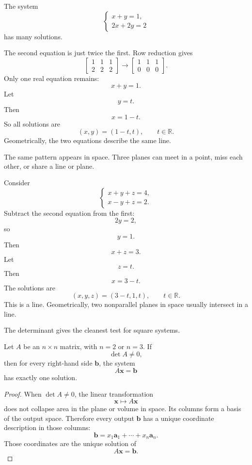 \begin{example}
The system
\[
\begin{cases}
x+y=1,\\
2x+2y=2
\end{cases}
\]
has many solutions.

The second equation is just twice the first.  Row reduction gives
\[
\left[
\begin{array}{cc|c}
1&1&1\\
2&2&2
\end{array}
\right]
\longrightarrow
\left[
\begin{array}{cc|c}
1&1&1\\
0&0&0
\end{array}
\right].
\]
Only one real equation remains:
\[
    x+y=1.
\]
Let
\[
    y=t.
\]
Then
\[
    x=1-t.
\]
So all solutions are
\[
\boxed{
    (x,y)=(1-t,t),\qquad t\in\mathbb R.
}
\]
Geometrically, the two equations describe the same line.
\end{example}

The same pattern appears in space.  Three planes can meet in a point, miss each other,
or share a line or plane.

\begin{example}
Consider
\[
\begin{cases}
x+y+z=4,\\
x-y+z=2.
\end{cases}
\]
Subtract the second equation from the first:
\[
    2y=2,
\]
so
\[
    y=1.
\]
Then
\[
    x+z=3.
\]
Let
\[
    z=t.
\]
Then
\[
    x=3-t.
\]
The solutions are
\[
\boxed{
    (x,y,z)=(3-t,1,t),\qquad t\in\mathbb R.
}
\]
This is a line.  Geometrically, two nonparallel planes in space usually intersect in a
line.
\end{example}

The determinant gives the cleanest test for square systems.

\begin{theorem}
Let \(A\) be an \(n\times n\) matrix, with \(n=2\) or \(n=3\).  If
\[
    \det A\neq0,
\]
then for every right-hand side \(\mathbf b\), the system
\[
    A\mathbf x=\mathbf b
\]
has exactly one solution.
\end{theorem}

\begin{proof}
When \(\det A\neq0\), the linear transformation
\[
    \mathbf x\longmapsto A\mathbf x
\]
does not collapse area in the plane or volume in space.  Its columns form a basis of
the output space.  Therefore every output \(\mathbf b\) has a unique coordinate
description in those columns:
\[
    \mathbf b=x_1\mathbf a_1+\cdots+x_n\mathbf a_n.
\]
Those coordinates are the unique solution of
\[
    A\mathbf x=\mathbf b.
\]
\end{proof}

